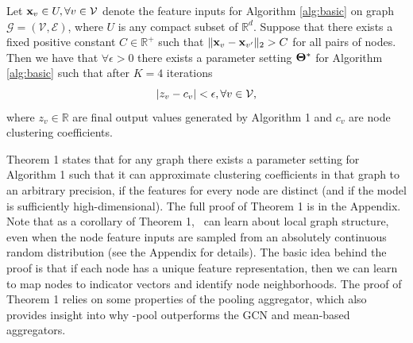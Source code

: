 \begin{theorem}\label{thm:main}
Let $\mathbf{x}_v \in U, \forall v \in \mathcal{V}$ denote the feature inputs for Algorithm \ref{alg:basic} on graph $\mathcal{G}=(\mathcal{V}, \mathcal{E})$, where $U$ is any compact subset of $\mathbb{R}^d$. Suppose that there exists a fixed positive constant $C \in \mathbb{R}^+$ such that $\|\mathbf{x}_v  - \mathbf{x}_{v'}\|_2 > C$ for all pairs of nodes. Then we have that $\forall \epsilon > 0$ there exists a parameter setting $\mathbf{\Theta}^*$ for Algorithm \ref{alg:basic} such that after $K=4$ iterations
$$|{z}_v - c_v| < \epsilon , \forall v \in \mathcal{\mathcal{V}},$$ where $z_v \in \mathbb{R}$ are final output values generated by Algorithm 1 and $c_v$ are node clustering coefficients.
\end{theorem}

Theorem 1 states that for any graph there exists a parameter setting for Algorithm 1 such that it can approximate clustering coefficients in that graph to an arbitrary precision, if the features for every node are distinct (and if the model is sufficiently high-dimensional). 
The full proof of Theorem 1 is in the Appendix. 
Note that as a corollary of Theorem 1, \name\ can learn about local graph structure, even when the node feature inputs are sampled from an absolutely continuous random distribution (see the Appendix for details).
The basic idea behind the proof is that if each node has a unique feature representation, then we can learn to map nodes to indicator vectors and identify node neighborhoods.
The proof of Theorem 1 relies on some properties of the pooling aggregator, which also provides insight into why \name-pool outperforms the GCN and mean-based aggregators. 